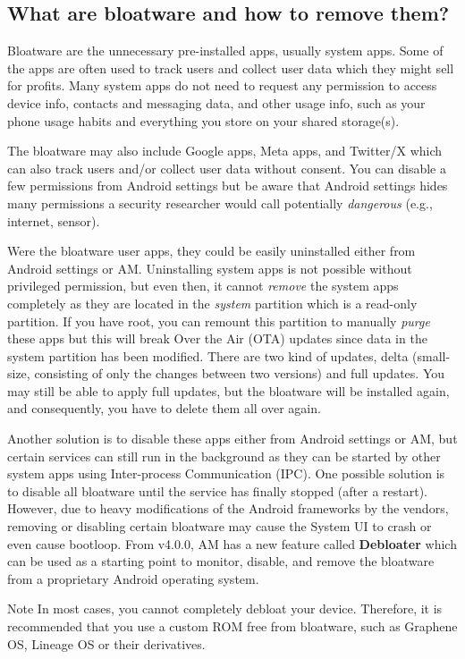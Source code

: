 \subsection{What are bloatware and how to remove them?}\label{subsec:faq:what-are-bloatware} %
Bloatware are the unnecessary pre-installed apps, usually system apps. Some of the apps are often
used to track users and collect user data which they might sell for profits. Many system apps do not
need to request any permission to access device info, contacts and messaging data, and other usage
info, such as your phone usage habits and everything you store on your shared storage(s).

The bloatware may also include Google apps, Meta apps, and Twitter/X which can also track users
and/or collect user data without consent. You can disable a few permissions from Android settings
but be aware that Android settings hides many permissions a security researcher would call
potentially \emph{dangerous} (e.g., internet, sensor).

Were the bloatware user apps, they could be easily uninstalled either from Android settings or AM\@.
Uninstalling system apps is not possible without privileged permission, but even then, it cannot
\emph{remove} the system apps completely as they are located in the \emph{system} partition which is
a read-only partition. If you have root, you can remount this partition to manually \emph{purge}
these apps but this will break Over the Air (OTA) updates since data in the system partition has
been modified. There are two kind of updates, delta (small-size, consisting of only the changes
between two versions) and full updates. You may still be able to apply full updates, but the
bloatware will be installed again, and consequently, you have to delete them all over again.

Another solution is to disable these apps either from Android settings or AM, but certain services
can still run in the background as they can be started by other system apps using Inter-process
Communication (IPC). One possible solution is to disable all bloatware until the service has finally
stopped (after a restart). However, due to heavy modifications of the Android frameworks by the
vendors, removing or disabling certain bloatware may cause the System UI to crash or even cause
bootloop. From v4.0.0, AM has a new feature called \textbf{Debloater} which can be used as a
starting point to monitor, disable, and remove the bloatware from a proprietary Android operating
system.

\begin{warning}{Note}
    In most cases, you cannot completely debloat your device. Therefore, it is recommended that you
    use a custom ROM free from bloatware, such as Graphene OS, Lineage OS or their derivatives.
\end{warning}
